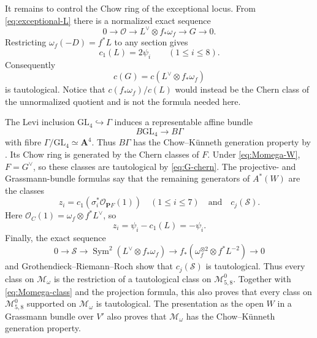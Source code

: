 \documentclass[12pt,reqno]{amsart}
\newcommand{\M}{\mathcal{M}}
\theoremstyle{definition}
\theoremstyle{remark}
\begin{document}
It remains to control the Chow ring of the exceptional locus.  From
\eqref{eq:exceptional-L} there is a normalized exact sequence
\begin{equation}\label{eq:normalized-G}
 0\longrightarrow\mathcal O\longrightarrow
 L^\vee\otimes f_*\omega_f\longrightarrow G\longrightarrow0.
\end{equation}
Restricting $\omega_f(-D)=f^*L$ to any section gives
\begin{equation}\label{eq:L-psi}
 c_1(L)=2\psi_i\qquad(1\leq i\leq8).
\end{equation}
Consequently
\begin{equation}\label{eq:G-chern}
 c(G)=c(L^\vee\otimes f_*\omega_f)
\end{equation}
is tautological.  Notice that $c(f_*\omega_f)/c(L)$ would instead be the
Chern class of the unnormalized quotient and is not the formula needed here.

The Levi inclusion $\mathrm{GL}_4\hookrightarrow\Gamma$ induces a
representable affine bundle
\begin{equation}\label{eq:levi-affine}
 B\mathrm{GL}_4\longrightarrow B\Gamma
\end{equation}
with fibre $\Gamma/\mathrm{GL}_4\simeq\mathbf A^4$.  Thus $B\Gamma$ has the
Chow--K\"unneth generation property by
\cite[Lemmas~3.5 and 3.8]{CanningLarsonStable}.  Its Chow ring is generated by
the Chern classes of $F$.  Under \eqref{eq:Momega-W}, $F=G^\vee$, so these
classes are tautological by \eqref{eq:G-chern}.  The projective- and
Grassmann-bundle formulas say that the remaining generators of $A^*(W)$ are
the classes
\[
 z_i=c_1(\sigma_i^*\mathcal O_{\mathbf P F}(1))\quad(1\leq i\leq7)
 \quad\text{and}\quad c_j(\mathcal S).
\]
Here $\mathcal O_C(1)=\omega_f\otimes f^*L^\vee$, so
\begin{equation}\label{eq:exceptional-z}
 z_i=\psi_i-c_1(L)=-\psi_i.
\end{equation}
Finally, the exact sequence
\begin{equation}\label{eq:exceptional-S}
 0\longrightarrow\mathcal S\longrightarrow
 \operatorname{Sym}^2(L^\vee\otimes f_*\omega_f)
 \longrightarrow f_*(\omega_f^{\otimes2}\otimes f^*L^{-2})
 \longrightarrow0
\end{equation}
and Grothendieck--Riemann--Roch show that $c_j(\mathcal S)$ is tautological.
Thus every class on $\M_\omega$ is the restriction of a tautological class on
$\M^0_{5,8}$.  Together with \eqref{eq:Momega-class} and the projection
formula, this also proves that every class on $\M^0_{5,8}$ supported on
$\M_\omega$ is tautological.  The presentation as the open $W$ in a
Grassmann bundle over $V'$ also proves that $\M_\omega$ has the
Chow--K\"unneth generation property.
\end{document}

